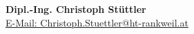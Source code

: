 \begin{figure}[H]
  \centering
  \caption*{\textbf{Dipl.-Ing. Christoph Stüttler}\\ \href{mailto:christoph.stuettler@ht-rankweil.at}{E-Mail: Christoph.Stuettler@ht-rankweil.at}}
\end{figure}